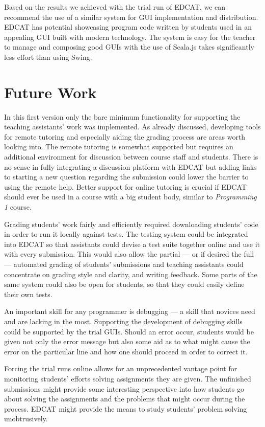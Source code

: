 Based on the results we achieved with the trial run of EDCAT, we can recommend the use of a similar system for GUI implementation and distribution. EDCAT has potential showcasing program code written by students used in an appealing GUI built with modern technology. The system is easy for the teacher to manage and composing good GUIs with the use of Scala.js takes significantly less effort than using Swing.


\section{Future Work}
\label{section:futureWork}

In this first version only the bare minimum functionality for supporting the teaching assistants' work was implemented. As already discussed, developing tools for remote tutoring and especially aiding the grading process are areas worth looking into. The remote tutoring is somewhat supported but requires an additional environment for discussion between course staff and students. There is no sense in fully integrating a discussion platform with EDCAT but adding links to starting a new question regarding the submission could lower the barrier to using the remote help. Better support for online tutoring is crucial if EDCAT should ever be used in a course with a big student body, similar to \emph{Programming 1} course.

Grading students' work fairly and efficiently required downloading students' code in order to run it locally against tests. The testing system could be integrated into EDCAT so that assistants could devise a test suite together online and use it with every submission. This would also allow the partial --- or if desired the full --- automated grading of students' submissions and teaching assistants could concentrate on grading style and clarity, and writing feedback. Some parts of the same system could also be open for students, so that they could easily define their own tests.

An important skill for any programmer is debugging --- a skill that novices need and are lacking in the most. Supporting the development of debugging skills could be supported by the trial GUIs. Should an error occur, students would be given not only the error message but also some aid as to what might cause the error on the particular line and how one should proceed in order to correct it.

Forcing the trial runs online allows for an unprecedented vantage point for monitoring students' efforts solving assignments they are given. The unfinished submissions might provide some interesting perspective into how students go about solving the assignments and the problems that might occur during the process. EDCAT might provide the means to study students' problem solving unobtrusively.

